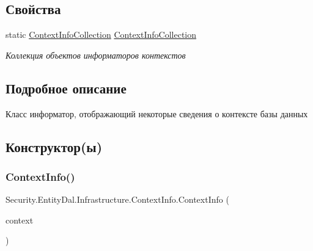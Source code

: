 \subsection*{Свойства}
\begin{DoxyCompactItemize}
\item 
static \hyperlink{class_security_1_1_entity_dal_1_1_infrastructure_1_1_context_info_collection}{Context\+Info\+Collection} \hyperlink{class_security_1_1_entity_dal_1_1_infrastructure_1_1_context_info_a2299ae5ae18c6ddc3ec978ab87f90a40}{Context\+Info\+Collection}
\begin{DoxyCompactList}\small\item\em Коллекция объектов информаторов контекстов \end{DoxyCompactList}\end{DoxyCompactItemize}


\subsection{Подробное описание}
Класс информатор, отображающий некоторые сведения о контексте базы данных 



\subsection{Конструктор(ы)}
\mbox{\label{class_security_1_1_entity_dal_1_1_infrastructure_1_1_context_info_a4c662fa70c4b9f7796cf8265818bc5b4}} 
\subsubsection{\texorpdfstring{Context\+Info()}{ContextInfo()}\hspace{0.1cm}{\footnotesize\ttfamily [1/2]}}
{\footnotesize\ttfamily Security.\+Entity\+Dal.\+Infrastructure.\+Context\+Info.\+Context\+Info (\begin{DoxyParamCaption}\item[{Db\+Context}]{context }\end{DoxyParamCaption})}



